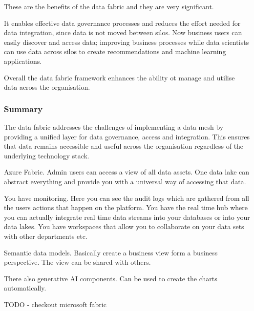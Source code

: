 These are the benefits of the data fabric and they are very significant.

It enables effective data governance processes and reduces the effort needed for data integration, since data is not moved between silos.
Now business users can easily discover and access data; improving business processes while data scientists can use data across silos to create recommendations and machine learning applications.

Overall the data fabric framework enhances the ability ot manage and utilise data across the organisation.

\subsubsection{Summary}
The data fabric addresses the challenges of implementing a data mesh by providing a unified layer for data governance, access and integration.
This ensures that data remains accessible and useful across the organisation regardless of the underlying technology stack.

Azure Fabric.
Admin users can access a view of all data assets.
One data lake can abstract everything and provide you with a universal way of accessing that data.

You have monitoring.
Here you can see the audit logs which are gathered from all the users actions that happen on the platform.
You have the real time hub where you can actually integrate real time data streams into your databases or into your data lakes.
You have workspaces that allow you to collaborate on your data sets with other departments etc.

Semantic data models.
Basically create a business view form a business perspective. The view can be shared with others.

There also generative AI components. Can be used to create the charts automatically.

TODO - checkout microsoft fabric

